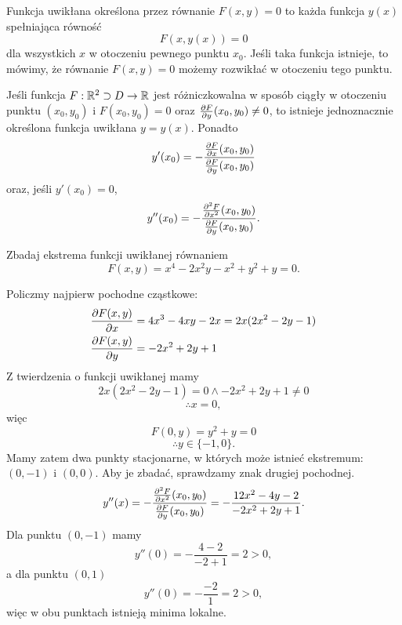 \begin{definition}
    Funkcja uwikłana określona przez równanie $F(x, y) = 0$ to każda funkcja $y(x)$ spełniająca równość
    \[ F(x, y(x)) = 0 \]
    dla wszystkich $x$ w otoczeniu pewnego punktu $x_0$. Jeśli taka funkcja istnieje, to mówimy, że równanie $F(x, y) = 0$ możemy rozwikłać w otoczeniu tego punktu.
\end{definition}

\begin{theorem}
    Jeśli funkcja $F : \mathbb R^2 \supset D \to \mathbb R$ jest różniczkowalna w sposób ciągły w otoczeniu punktu $(x_0, y_0)$ i $F(x_0, y_0) = 0$ oraz $\frac{\operatorname{\partial}\!{F}}{\operatorname{\partial}\!{y}}(x_0, y_0) \neq 0$, to istnieje jednoznacznie określona funkcja uwikłana $y = y(x)$. Ponadto
    \[ y'(x_0) = -\frac{\frac{\operatorname{\partial}\!{F}}{\operatorname{\partial}\!{x}}(x_0, y_0)}{\frac{\operatorname{\partial}\!{F}}{\operatorname{\partial}\!{y}}(x_0, y_0)} \]
    oraz, jeśli $y'(x_0) = 0$,
    \[ y''(x_0) = -\frac{\frac{\operatorname{\partial}\!{}^2 F}{\operatorname{\partial}\!{x}^2}(x_0, y_0)}{\frac{\operatorname{\partial}\!{F}}{\operatorname{\partial}\!{y}}(x_0, y_0)}. \]
\end{theorem}

\begin{example}
    Zbadaj ekstrema funkcji uwikłanej równaniem
    \[ F(x, y) = x^4 - 2x^2y - x^2 + y^2 + y = 0. \]
\end{example}
\begin{solution}
    Policzmy najpierw pochodne cząstkowe:
    \begin{align*}
        \frac{\operatorname{\partial}\!{F}(x, y)}{\operatorname{\partial}\!{x}} &= 4x^3 - 4xy - 2x = 2x(2x^2 - 2y - 1) \\
        \frac{\operatorname{\partial}\!{F}(x, y)}{\operatorname{\partial}\!{y}} &= -2x^2 + 2y + 1
    \end{align*}
    Z twierdzenia o funkcji uwikłanej mamy
    \[ 2x(2x^2 - 2y - 1) = 0 \land -2x^2 + 2y + 1 \neq 0 \]
    \[ \therefore x = 0, \]
    więc
    \[ F(0, y) = y^2 + y = 0 \]
    \[ \therefore y \in \{-1, 0\}. \]
    Mamy zatem dwa punkty stacjonarne, w których może istnieć ekstremum: $(0, -1)$ i $(0, 0)$. Aby je zbadać, sprawdzamy znak drugiej pochodnej.
    \[ y''(x) = -\frac{\frac{\operatorname{\partial}\!{}^2 F}{\operatorname{\partial}\!{x}^2}(x_0, y_0)}{\frac{\operatorname{\partial}\!{F}}{\operatorname{\partial}\!{y}}(x_0, y_0)} = -\frac{12x^2 - 4y - 2}{-2x^2 + 2y + 1}. \]
    Dla punktu $(0, -1)$ mamy
    \[ y''(0) = -\frac{4 - 2}{-2 + 1} = 2 > 0, \]
    a dla punktu $(0, 1)$
    \[ y''(0) = -\frac{-2}{1} = 2 > 0, \]
    więc w obu punktach istnieją minima lokalne.
\end{solution}